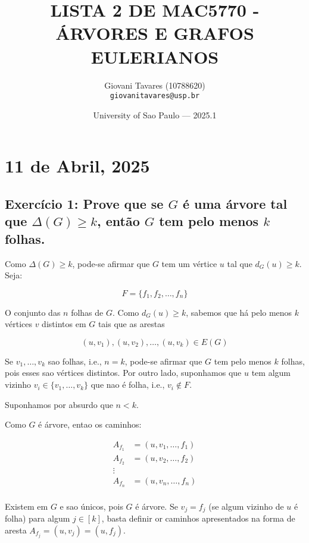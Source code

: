 \documentclass{article}
\title{LISTA 2 DE MAC5770 - ÁRVORES E GRAFOS EULERIANOS} %
\author{Giovani Tavares (10788620)\\ \texttt{giovanitavares@usp.br}} %
\date{University of Sao Paulo --- 2025.1} %
\begin{document}
\maketitle %


\section{11 de Abril, 2025} %

 
 
 \subsection{Exercício 1:  Prove que se $G$ é uma árvore tal que $\Delta(G) \geq k$, então $G$ tem pelo menos $k$ folhas.}
 
 
 Como $\Delta(G) \geq k$, pode-se afirmar que $G$ tem um vértice $u$ tal que $d_G(u) \geq k$. Seja:
 
 $$
 F = \{f_1, f_2, \ldots, f_n\}
 $$

O conjunto das $n$ folhas de $G$. Como $d_G(u) \geq k$, sabemos que há pelo menos $k$ vértices $v$ distintos em $G$ tais que as arestas

$$
(u, v_1), (u, v_2), \ldots, (u, v_k) \in E(G)
$$

Se $v_1, \ldots, v_k$ sao folhas, i.e., $n = k$, pode-se afirmar que $G$ tem pelo menos $k$ folhas, pois esses sao vértices distintos. Por outro lado, suponhamos que $u$ tem algum vizinho $v_i \in \{ v_1, \dots, v_k \}$ que nao é folha, i.e., $v_i \notin F$.

Suponhamos por absurdo que $n < k$.

Como $G$ é árvore, entao os caminhos:

\begin{align*}
	A_{f_1} &= (u, v_1, \ldots, f_1) \\
	A_{f_2} &= (u, v_2, \ldots, f_2) \\
	\vdots \\
	A_{f_n} &= (u, v_n, \ldots, f_n) \\
\end{align*}

Existem em $G$ e sao únicos, pois $G$ é árvore. Se $v_j = f_j$ (se algum vizinho de $u$ é folha) para algum $j \in [k]$, basta definir or caminhos apresentados na forma de aresta $A_{f_j} = (u, v_j) = (u, f_j)$.
\end{document}
